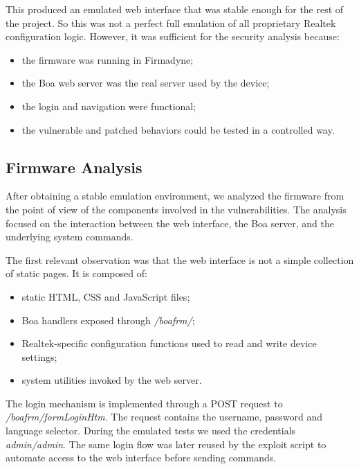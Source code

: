               This produced an emulated web interface that was stable enough for the rest of the project. So this was not a perfect full emulation of all proprietary Realtek configuration
              logic. However, it was sufficient for the security analysis because:
              \begin{itemize}
                  \item the firmware was running in Firmadyne;
                  \item the Boa web server was the real server used by the device;
                  \item the login and navigation were functional;
                  \item the vulnerable and patched behaviors could be tested in a controlled way.
              \end{itemize}

          \subsection{Firmware Analysis}

              After obtaining a stable emulation environment, we analyzed the firmware from the point of view of the components involved in the vulnerabilities. The analysis focused on the interaction between the web
              interface, the Boa server, and the underlying system commands.

              The first relevant observation was that the web interface is not a simple collection of static pages. It is composed of:
              \begin{itemize}
                  \item static HTML, CSS and JavaScript files;
                  \item Boa handlers exposed through \emph{/boafrm/};
                  \item Realtek-specific configuration functions used to read and write device settings;
                  \item system utilities invoked by the web server.
              \end{itemize}

              The login mechanism is implemented through a POST request to \emph{/boafrm/formLoginHtm}. The request contains the username, password and language selector. During the emulated tests we used the
              credentials \emph{admin/admin}. The same login flow was later reused by the exploit script to automate access to the web interface before sending commands.

